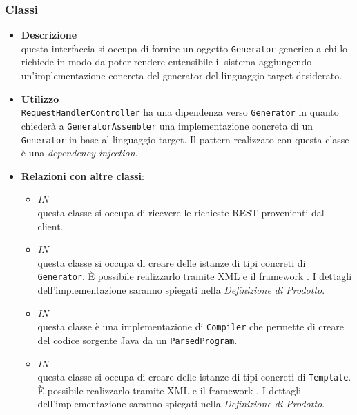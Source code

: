 \subsubsection{Classi}
\label{\nogloxy{swedesigner::server::generator::Generator}}
\begin{itemize}
\item \textbf{Descrizione}\\
questa interfaccia si occupa di fornire un oggetto \texttt{Generator} generico a chi lo richiede in modo da poter rendere entensibile il sistema aggiungendo un'implementazione concreta del generator del linguaggio target desiderato.
\item \textbf{Utilizzo}\\
\texttt{RequestHandlerController} ha una dipendenza verso \texttt{Generator} in quanto chiederà a \texttt{GeneratorAssembler} una implementazione concreta di un \texttt{Generator} in base al linguaggio target. Il pattern realizzato con questa classe è una \emph{dependency injection}.
\item \textbf{Relazioni con altre classi}:
\begin{itemize}
\item \textit{IN} \hyperref[\nogloxy{swedesigner::server::controller::RequestHandlerController}]{}\\
questa classe si occupa di ricevere le richieste REST provenienti dal client.
\item \textit{IN} \hyperref[\nogloxy{swedesigner::server::generator::GeneratorAssembler}]{}\\
questa classe si occupa di creare delle istanze di tipi concreti di \texttt{Generator}. È possibile realizzarlo tramite XML e il framework \spring. I dettagli dell'implementazione saranno spiegati nella \emph{Definizione di Prodotto}. %
\item \textit{IN} \hyperref[\nogloxy{swedesigner::server::generator::java::JavaGenerator}]{}\\
questa classe è una implementazione di \texttt{Compiler} che permette di creare del codice sorgente Java da un \texttt{ParsedProgram}.
\item \textit{IN} \hyperref[\nogloxy{swedesigner::server::template::TemplateAssembler}]{}\\
questa classe si occupa di creare delle istanze di tipi concreti di \texttt{Template}. È possibile realizzarlo tramite XML e il framework \spring. I dettagli dell'implementazione saranno spiegati nella \emph{Definizione di Prodotto}. %

\end{itemize}
\end{itemize}
